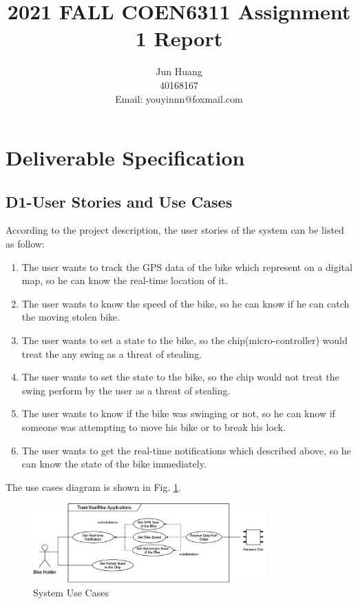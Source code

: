 \documentclass[technote, transmag, onecolumn, 9pt]{IEEEtran}
\title{2021 FALL COEN6311 Assignment 1 Report}
\author{Jun Huang\\40168167\\Email: youyinnn@foxmail.com}
\begin{document}
\maketitle

\section{Deliverable Specification}

\subsection*{\textbf{D1-User Stories and Use Cases}}

According to the project description, the user stories of the system can be listed as follow:

\begin{enumerate}
	\item The user wants to track the GPS data of the bike which represent on a digital map,
	      so he can know the real-time location of it.
	\item The user wants to know the speed of the bike, so he can know if he can catch the moving stolen bike.

	\item The user wants to set a  state to the bike,
	      so the chip(micro-controller) would treat the any swing as a threat of stealing.

	\item The user wants to set the  state to the bike,
	      so the chip would not treat the swing perform by the user as a threat of stealing.

	\item The user wants to know if the bike was swinging or not,
	      so he can know if someone was attempting to move his bike or to break his lock.

	\item The user wants to get the real-time notifications which described above,
	      so he can know the state of the bike immediately.
\end{enumerate}

The use cases diagram is shown in Fig. \ref{fig:use-cases}.

\begin{figure}[!hb]
	\centering
	\includegraphics[width=0.8\textwidth]{./img/f1-use-cases.png}
	\caption{System Use Cases}
	\label{fig:use-cases}
\end{figure}
\end{document}
